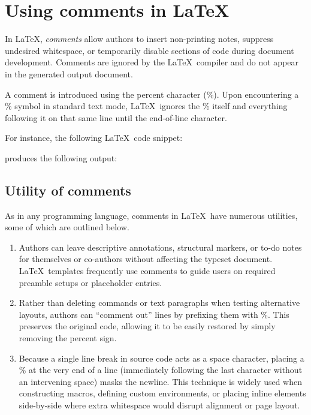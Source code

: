 \section{Using comments in \LaTeX}
	In \LaTeX, \emph{comments} allow authors to insert non-printing notes, suppress undesired whitespace, or temporarily disable sections of code during document development. Comments are ignored by the \LaTeX\ compiler and do not appear in the generated output document.
	
	A comment is introduced using the percent character (\%). Upon encountering a \% symbol in standard text mode, \LaTeX\ ignores the \% itself and everything following it on that same line until the end-of-line character.
	
	For instance, the following \LaTeX\ code snippet:

	produces the following output:
	
	\subsection{Utility of comments}
		As in any programming language, comments in \LaTeX\ have numerous utilities, some of which are outlined below.
		\begin{enumerate}
			\item Authors can leave descriptive annotations, structural markers, or to-do notes for themselves or co-authors without affecting the typeset document. \LaTeX\ templates frequently use comments to guide users on required preamble setups or placeholder entries.
			
			\item Rather than deleting commands or text paragraphs when testing alternative layouts, authors can ``comment out'' lines by prefixing them with \%. This preserves the original code, allowing it to be easily restored by simply removing the percent sign.
			
			\item Because a single line break in source code acts as a space character, placing a \% at the very end of a line (immediately following the last character without an intervening space) masks the newline. This technique is widely used when constructing macros, defining custom environments, or placing inline elements side-by-side where extra whitespace would disrupt alignment or page layout.
		\end{enumerate}
	
	